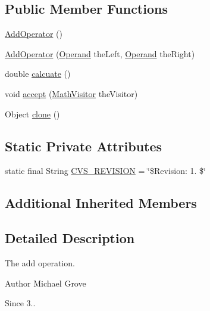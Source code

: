 \subsection*{Public Member Functions}
\begin{DoxyCompactItemize}
\item 
\hyperlink{classexamples_1_1math_1_1cmd_1_1_add_operator_ae395d20680a564b727ec445affd1a5a9}{Add\-Operator} ()
\item 
\hyperlink{classexamples_1_1math_1_1cmd_1_1_add_operator_a4b61ad1ecfe81d39c6bf6205bacd9e21}{Add\-Operator} (\hyperlink{interfaceexamples_1_1math_1_1cmd_1_1_operand}{Operand} the\-Left, \hyperlink{interfaceexamples_1_1math_1_1cmd_1_1_operand}{Operand} the\-Right)
\item 
double \hyperlink{classexamples_1_1math_1_1cmd_1_1_add_operator_a2f5f91fe8ca269a76e26554ffb4795ae}{calcuate} ()
\item 
void \hyperlink{classexamples_1_1math_1_1cmd_1_1_add_operator_a1b760c381dd1a76188bbb61e0a92b0bc}{accept} (\hyperlink{interfaceexamples_1_1math_1_1_math_visitor}{Math\-Visitor} the\-Visitor)
\item 
Object \hyperlink{classexamples_1_1math_1_1cmd_1_1_add_operator_ad929bb2675ec30f20015f51c82f92569}{clone} ()
\end{DoxyCompactItemize}
\subsection*{Static Private Attributes}
\begin{DoxyCompactItemize}
\item 
static final String \hyperlink{classexamples_1_1math_1_1cmd_1_1_add_operator_a99850a210d2150a17fe5fd32e4bbc286}{C\-V\-S\-\_\-\-R\-E\-V\-I\-S\-I\-O\-N} = \char`\"{}\$Revision\-: 1. \$\char`\"{}
\end{DoxyCompactItemize}
\subsection*{Additional Inherited Members}


\subsection{Detailed Description}
The add operation.

\begin{DoxyAuthor}{Author}
Michael Grove 
\end{DoxyAuthor}
\begin{DoxySince}{Since}
3.. 
\end{DoxySince}


